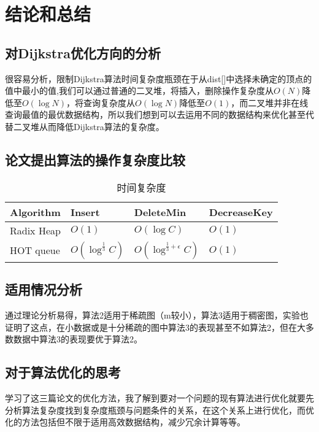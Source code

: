 \chapter{结论和总结}
\section{对Dijkstra优化方向的分析}
很容易分析，限制Dijkstra算法时间复杂度瓶颈在于从dist[]中选择未确定的顶点的值中最小的值,我们可以通过普通的二叉堆，将插入，删除操作复杂度从$O(N)$降低至$O(\log N)$，将查询复杂度从$O(\log N)$降低至$O(1)$，而二叉堆并非在线查询最值的最优数据结构，所以我们想到可以去运用不同的数据结构来优化甚至代替二叉堆从而降低Dijkstra算法的复杂度。
\section{论文提出算法的操作复杂度比较}
\begin{table}[H]
  \caption{时间复杂度}
  \centering
  \begin{tabular}{p{3.2cm}<{\centering}p{3.2cm}<{\centering}p{3.2cm}<{\centering}p{3.2cm}<{\centering}}
  \toprule
   Algorithm & Insert & DeleteMin & DecreaseKey\\
  \midrule
   Radix Heap  & $O(1)$ & $O(\log C)$ & $O(1)$ \\
   HOT queue  & $O(\log ^{\frac{1}{3}}C)$ & $O(\log ^{\frac{1}{3}+\epsilon}C)$ & $O(1)$\\
  \bottomrule
  \end{tabular} 
\end{table}


\section{适用情况分析}
通过理论分析易得，算法2适用于稀疏图（m较小），算法3适用于稠密图，实验也证明了这点，在小数据或是十分稀疏的图中算法3的表现甚至不如算法2，但在大多数数据中算法3的表现要优于算法2。

\section{对于算法优化的思考}
学习了这三篇论文的优化方法，我了解到要对一个问题的现有算法进行优化就要先分析算法复杂度找到复杂度瓶颈与问题条件的关系，在这个关系上进行优化，而优化的方法包括但不限于适用高效数据结构，减少冗余计算等等。